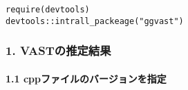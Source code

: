 \documentclass[]{article}
\let\oldparagraph\paragraph
\renewcommand{\paragraph}[1]{\oldparagraph{#1}\mbox{}}
\begin{document}
\begin{verbatim}
require(devtools)
devtools::intrall_packeage("ggvast")
\end{verbatim}

\hypertarget{vastux306eux63a8ux5b9aux7d50ux679c}{%
\subsubsection{1.
VASTの推定結果}\label{vastux306eux63a8ux5b9aux7d50ux679c}}

\hypertarget{cppux30d5ux30a1ux30a4ux30ebux306eux30d0ux30fcux30b8ux30e7ux30f3ux3092ux6307ux5b9a-1}{%
\paragraph{1.1
cppファイルのバージョンを指定}\label{cppux30d5ux30a1ux30a4ux30ebux306eux30d0ux30fcux30b8ux30e7ux30f3ux3092ux6307ux5b9a-1}}
\end{document}
